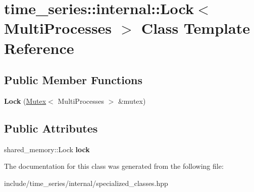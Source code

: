 \hypertarget{classtime__series_1_1internal_1_1Lock_3_01MultiProcesses_01_4}{}\section{time\+\_\+series\+:\+:internal\+:\+:Lock$<$ Multi\+Processes $>$ Class Template Reference}
\label{classtime__series_1_1internal_1_1Lock_3_01MultiProcesses_01_4}
\subsection*{Public Member Functions}
\begin{DoxyCompactItemize}
\item 
\mbox{\label{classtime__series_1_1internal_1_1Lock_3_01MultiProcesses_01_4_a920c36e5d5c29357484e030a271f6863}} 
{\bfseries Lock} (\hyperlink{classtime__series_1_1internal_1_1Mutex}{Mutex}$<$ Multi\+Processes $>$ \&mutex)
\end{DoxyCompactItemize}
\subsection*{Public Attributes}
\begin{DoxyCompactItemize}
\item 
\mbox{\label{classtime__series_1_1internal_1_1Lock_3_01MultiProcesses_01_4_a05955b0a5a1ef50e3e351337268ac943}} 
shared\+\_\+memory\+::\+Lock {\bfseries lock}
\end{DoxyCompactItemize}


The documentation for this class was generated from the following file\+:\begin{DoxyCompactItemize}
\item 
include/time\+\_\+series/internal/specialized\+\_\+classes.\+hpp\end{DoxyCompactItemize}
